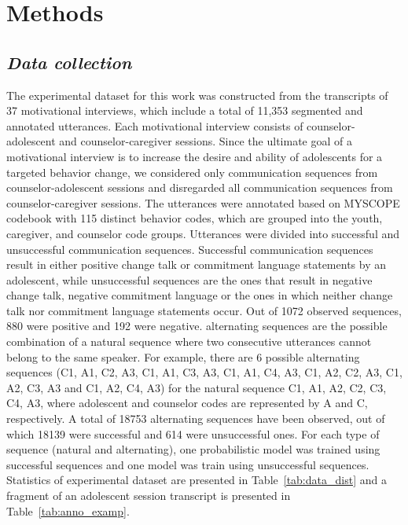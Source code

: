 \documentclass{amia}
\begin{document}
\section*{Methods}
\subsection*{\textit{Data collection}}
The experimental dataset for this work was constructed from the transcripts of 37 motivational interviews, which include a total of 11,353 segmented and annotated utterances. Each motivational interview consists of counselor-adolescent and counselor-caregiver sessions. Since the ultimate goal of a motivational interview is to increase the desire and ability of adolescents for a targeted behavior change, we considered only communication sequences from counselor-adolescent sessions and disregarded all communication sequences from counselor-caregiver sessions. The utterances were annotated based on MYSCOPE codebook \cite{carcone2013provider} with 115 distinct behavior codes, which are grouped into the youth, caregiver, and counselor code groups. Utterances were divided into successful and unsuccessful communication sequences. Successful communication sequences result in either positive change talk or commitment language statements by an adolescent, while unsuccessful sequences are the ones that result in negative change talk, negative commitment language or the ones in which neither change talk nor commitment language statements occur. Out of 1072 observed sequences, 880 were positive and 192 were negative. alternating sequences are the possible combination of a natural sequence where two consecutive utterances cannot belong to the same speaker. For example, there are 6 possible alternating sequences ({C1, A1, C2, A3}, {C1, A1, C3, A3}, {C1, A1, C4, A3}, {C1, A2, C2, A3}, {C1, A2, C3, A3} and {C1, A2, C4, A3}) for the natural sequence {C1, A1, A2, C2, C3, C4, A3}, where adolescent and counselor codes are represented by A and C, respectively. A total of 18753 alternating sequences have been observed, out of which 18139 were successful and 614 were unsuccessful ones. For each type of sequence (natural and alternating), one probabilistic model was trained using successful sequences and one model was train using unsuccessful sequences. Statistics of experimental dataset are presented in Table~\ref{tab:data_dist} and a fragment of an adolescent session transcript is presented in Table~\ref{tab:anno_examp}. \\
\end{document}
